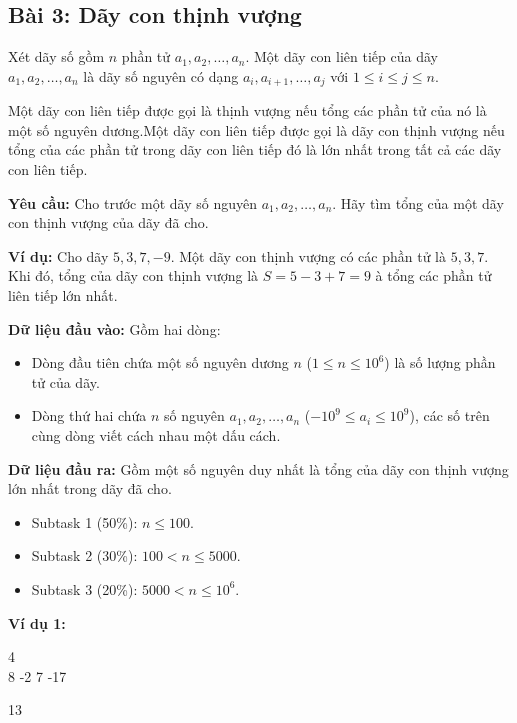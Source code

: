 \documentclass[12pt]{scrartcl}  %
\begin{document}
\subsection{Bài 3: Dãy con thịnh vượng}
Xét dãy số gồm $n$ phần tử $a_1, a_2, \ldots, a_n$. Một dãy con liên tiếp của dãy $a_1, a_2, \ldots, a_n$ là dãy số nguyên có dạng $a_i, a_{i+1}, \ldots, a_j$ với $1 \leq i \leq j \leq n$.

Một dãy con liên tiếp được gọi là thịnh vượng nếu tổng các phần tử của nó là một số nguyên dương.Một dãy con liên tiếp được gọi là dãy con thịnh vượng nếu tổng của các phần tử trong dãy con liên tiếp đó là lớn nhất trong tất cả các dãy con liên tiếp.

\textbf{Yêu cầu:}
Cho trước một dãy số nguyên $a_1, a_2, \ldots, a_n$. Hãy tìm tổng của một dãy con thịnh vượng của dãy đã cho. 

\textbf{Ví dụ:} Cho dãy $5, 3, 7, -9$. Một dãy con thịnh vượng có các phần tử là $5, 3, 7$. Khi đó, tổng của dãy con thịnh vượng là $S = 5 - 3 + 7 = 9$ à tổng các phần tử liên tiếp lớn nhất. 

\textbf{Dữ liệu đầu vào:}
Gồm hai dòng:
\begin{itemize}
    \item Dòng đầu tiên chứa một số nguyên dương $n$ ($1 \leq n \leq 10^6$) là số lượng phần tử của dãy.
    \item Dòng thứ hai chứa $n$ số nguyên $a_1, a_2, \ldots, a_n$ ($-10^9 \leq a_i \leq 10^9$), các số trên cùng dòng viết cách nhau một dấu cách.
\end{itemize}

\textbf{Dữ liệu đầu ra:}
Gồm một số nguyên duy nhất là tổng của dãy con thịnh vượng lớn nhất trong dãy đã cho. 

\begin{itemize}
    \item Subtask 1 (50\%): $n \leq 100$.
    \item Subtask 2 (30\%): $100 < n \leq 5000$.
    \item Subtask 3 (20\%): $5000 < n \leq 10^6$.
\end{itemize}

\textbf{Ví dụ 1:}
\begin{tcolorbox}[colback=gray!5!white, colframe=blue!50!black, title=Input]
4\\
8 -2 7 -17
\end{tcolorbox}
\begin{tcolorbox}[colback=gray!5!white, colframe=green!50!black, title=Output]
13
\end{tcolorbox}
\end{document}
